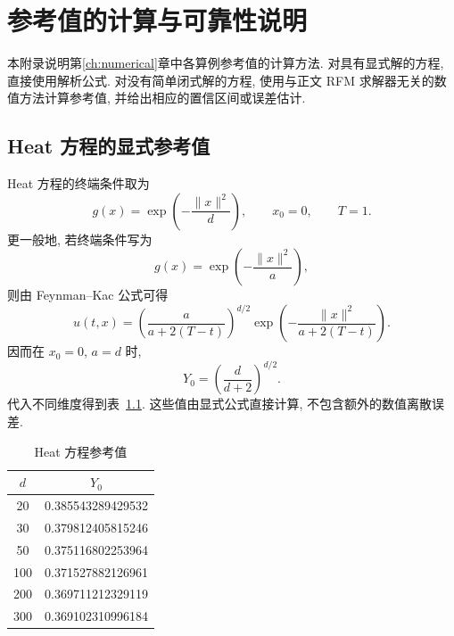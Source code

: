 
\chapter{参考值的计算与可靠性说明}\label{ch:refval}
  本附录说明第\ref{ch:numerical}章中各算例参考值的计算方法.
  对具有显式解的方程, 直接使用解析公式.
  对没有简单闭式解的方程, 使用与正文 RFM 求解器无关的数值方法计算参考值,
  并给出相应的置信区间或误差估计.

  \section{Heat 方程的显式参考值}\label{sec:ref_heat}
    Heat 方程的终端条件取为
    \begin{equation}
      g(x)=\exp\!\left(-\frac{\lVert x\rVert^2}{d}\right),
      \qquad x_0=0,\qquad T=1.
      \label{eq:heatterm}
    \end{equation}
    更一般地, 若终端条件写为
    \begin{equation*}
      g(x)=\exp\!\left(-\frac{\lVert x\rVert^2}{a}\right),
    \end{equation*}
    则由 Feynman--Kac 公式可得
    \begin{equation}
      u(t,x)
      =
      \left(\frac{a}{a+2(T-t)}\right)^{d/2}
      \exp\!\left(
              -\frac{\lVert x\rVert^2}{a+2(T-t)}
      \right).
      \label{eq:numerical_heat_solution}
    \end{equation}
    因而在 $x_0=0$, $a=d$ 时,
    \begin{equation}
      Y_0 = \left(\frac{d}{d+2}\right)^{d/2}.
      \label{eq:heaty0}
    \end{equation}
    代入不同维度得到表~\ref{tab:ref_heat}.
    这些值由显式公式直接计算, 不包含额外的数值离散误差.

    \begin{table}
      \centering
      \caption{Heat 方程参考值}
      \label{tab:ref_heat}
      \begin{tabular}{cc}
        \toprule
        $d$ & $Y_0$ \\
        \midrule
        20 & 0.385543289429532 \\
        30 & 0.379812405815246 \\
        50 & 0.375116802253964 \\
        100 & 0.371527882126961 \\
        200 & 0.369711212329119 \\
        300 & 0.369102310996184 \\
        \bottomrule
      \end{tabular}
    \end{table}

